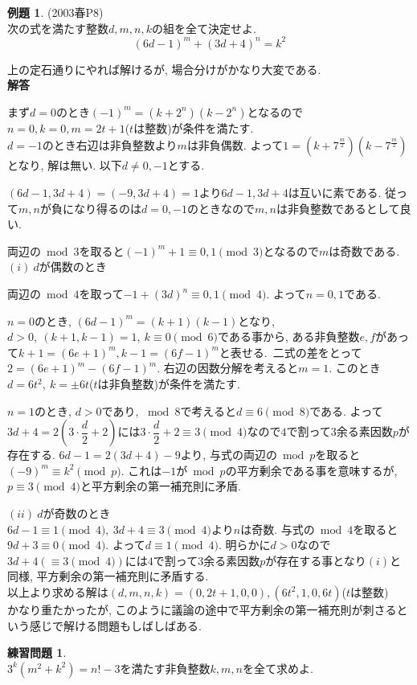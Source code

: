 \documentclass{ltjsarticle}
\theoremstyle{definition}
\newtheorem{prob}{練習問題}
\newtheorem{expr}{例題}
\begin{document}
\begin{expr}(2003春P8)\\
次の式を満たす整数$d,m,n,k$の組を全て決定せよ.$$(6d-1)^m+(3d+4)^n=k^2$$
\end{expr}

上の定石通りにやれば解けるが, 場合分けがかなり大変である.\\
\textbf{解答}

まず$d=0$のとき$(-1)^m=(k+2^n)(k-2^n)$となるので$n=0,k=0,m=2t+1$($t$は整数)が条件を満たす.\\
$d=-1$のとき右辺は非負整数より$m$は非負偶数. よって$1=(k+7^{\frac m2})(k-7^{\frac m2})$となり, 解は無い. 以下$d\neq 0,-1$とする.

$(6d-1,3d+4)=(-9,3d+4)=1$より$6d-1,3d+4$は互いに素である. 従って$m,n$が負になり得るのは$d=0,-1$のときなので$m,n$は非負整数であるとして良い.

両辺の$\bmod3$を取ると$(-1)^m+1\equiv0,1\pmod3$となるので$m$は奇数である.\\
$(i)\ d$が偶数のとき

両辺の$\bmod 4$を取って$-1+(3d)^n\equiv0,1\pmod4$. よって$n=0,1$である.

$n=0$のとき, $(6d-1)^m=(k+1)(k-1)$となり, $d>0,\ (k+1,k-1)=1,\ k\equiv0\pmod6$である事から, ある非負整数$e,f$があって$k+1=(6e+1)^m,k-1=(6f-1)^m$と表せる.\ 二式の差をとって$2=(6e+1)^m-(6f-1)^m$. 右辺の因数分解を考えると$m=1$. このとき$d=6t^2,\ k=\pm6t$($t$は非負整数)が条件を満たす.

$n=1$のとき, $d>0$であり, $\bmod8$で考えると$d\equiv6\pmod8$である. よって $3d+4=2\left(3\cdot\dfrac{d}2+2\right)$には$3\cdot\dfrac d2+2\equiv3\pmod4$なので$4$で割って$3$余る素因数$p$が存在する. $6d-1=2(3d+4)-9$より, 与式の両辺の$\bmod p$を取ると$(-9)^m\equiv k^2\pmod p$. これは$-1$が$\bmod p$の平方剰余である事を意味するが, $p\equiv3\pmod 4$と平方剰余の第一補充則に矛盾.

$(ii)\ d$が奇数のとき\\
$6d-1\equiv1\pmod4,\ 3d+4\equiv 3\pmod4$より$n$は奇数. 与式の$\bmod 4$を取ると$9d+3\equiv0\pmod4$. よって$d\equiv1\pmod4$. 明らかに$d>0$なので$3d+4(\equiv3\pmod4)$には$4$で割って$3$余る素因数$p$が存在する事となり$(i)$と同様, 平方剰余の第一補充則に矛盾する.\\
以上より求める解は$(d,m,n,k)=(0,2t+1,0,0),(6t^2,1,0,6t)$($t$は整数)\\

かなり重たかったが, このように議論の途中で平方剰余の第一補充則が刺さるという感じで解ける問題もしばしばある.

\begin{prob}\ \\
$3^k(m^2+k^2)=n!-3$を満たす非負整数$k,m,n$を全て求めよ.
\end{prob}
\end{document}
